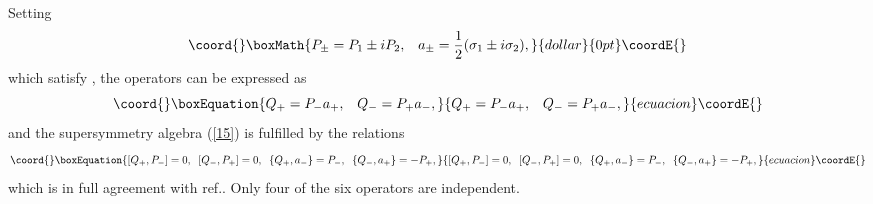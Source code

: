 \documentclass[a4paper,12pt,a4]{article}
\begin{document}
Setting
$$\coord{}\boxMath{
P_{\pm} = P_1\pm iP_2, \;\;\;a_{\pm}=\frac{1}{2}(\sigma_1 \pm i\sigma_2),
}{dollar}{0pt}\coordE{}$$
which satisfy \coordHE{}, 
the operators \coordHE{} can be expressed as
\begin{equation}\coord{}\boxEquation{
Q_+=P_-a_+, \;\;\; Q_-=P_+a_-,
\label{17}
}{
Q_+=P_-a_+, \;\;\; Q_-=P_+a_-,
}{ecuacion}\coordE{}\end{equation}
and the supersymmetry algebra (\ref{15}) is
fulfilled by the relations
\begin{equation}\coord{}\boxEquation{
[Q_+, P_-]=0, \;\;[Q_-, P_+]=0, \;\;\{Q_+, a_-\}=P_-,
\;\;\{Q_-, a_+\}=-P_+,
\label{18}
}{
[Q_+, P_-]=0, \;\;[Q_-, P_+]=0, \;\;\{Q_+, a_-\}=P_-,
\;\;\{Q_-, a_+\}=-P_+,
}{ecuacion}\coordE{}\end{equation}
which is in full agreement with ref.\cite{11}.
Only four of the six operators are independent.
\end{document}
